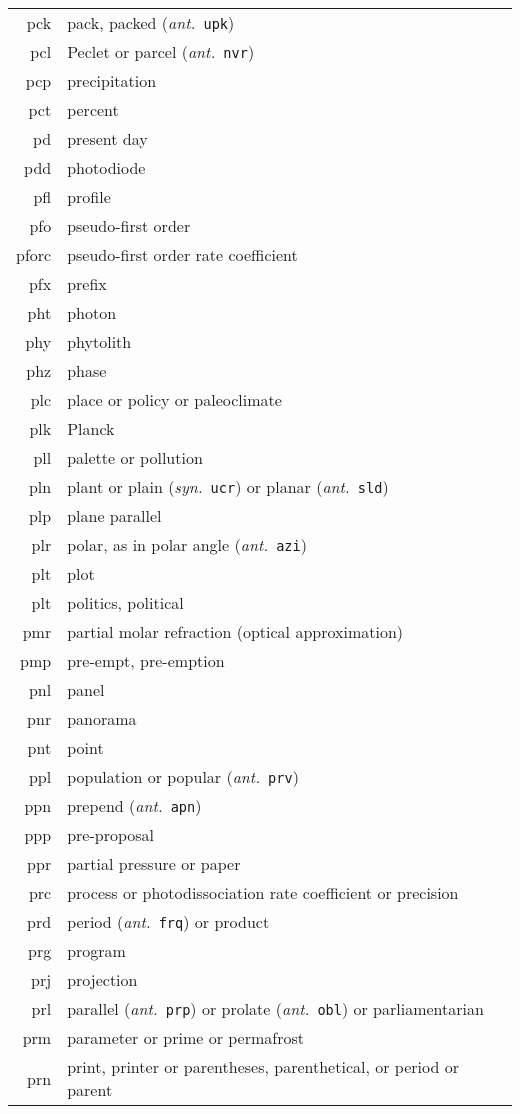 \documentclass[12pt,twoside]{article}
\newcommand{\ant}[1]{(\textit{ant.}~\texttt{#1})}
\newcommand{\syn}[1]{(\textit{syn.}~\texttt{#1})}
\begin{document}
\begin{longtable}[>{\bfseries}l]{>{\ttfamily}r l}
pck & pack, packed \ant{upk} \\
pcl & Peclet or parcel \ant{nvr} \\
pcp & precipitation \\
pct & percent \\
pd & present day \\
pdd & photodiode \\
pfl & profile \\
pfo & pseudo-first order \\
pforc & pseudo-first order rate coefficient \\
pfx & prefix \\
pht & photon \\
phy & phytolith \\
phz & phase \\
plc & place or policy or paleoclimate \\
plk & Planck \\
pll & palette or pollution \\
pln & plant or plain \syn{ucr} or planar \ant{sld} \\
plp & plane parallel \\
plr & polar, as in polar angle \ant{azi} \\
plt & plot \\
plt & politics, political \\
pmr & partial molar refraction (optical approximation) \\
pmp & pre-empt, pre-emption \\
pnl & panel \\
pnr & panorama \\
pnt & point \\
ppl & population or popular \ant{prv} \\
ppn & prepend \ant{apn} \\
ppp & pre-proposal \\
ppr & partial pressure or paper \\
prc & process or photodissociation rate coefficient or precision \\
prd & period \ant{frq} or product \\
prg & program \\
prj & projection \\
prl & parallel \ant{prp} or prolate \ant{obl} or parliamentarian \\
prm & parameter or prime or permafrost \\
prn & print, printer or parentheses, parenthetical, or period or parent \\

\end{longtable}
\end{document}
